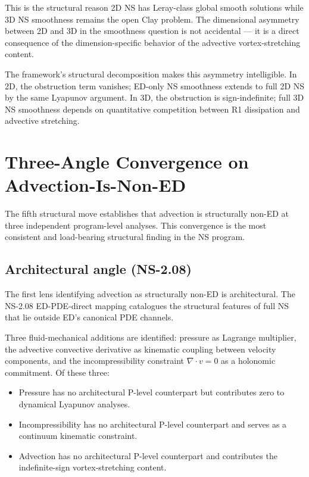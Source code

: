 \documentclass[11pt,a4paper]{article}
\begin{document}
This is the structural reason 2D NS has Leray-class global smooth solutions while 3D NS smoothness remains the open Clay problem. The dimensional asymmetry between 2D and 3D in the smoothness question is not accidental --- it is a direct consequence of the dimension-specific behavior of the advective vortex-stretching content.

The framework's structural decomposition makes this asymmetry intelligible. In 2D, the obstruction term vanishes; ED-only NS smoothness extends to full 2D NS by the same Lyapunov argument. In 3D, the obstruction is sign-indefinite; full 3D NS smoothness depends on quantitative competition between R1 dissipation and advective stretching.

\section{Three-Angle Convergence on Advection-Is-Non-ED}

The fifth structural move establishes that advection is structurally non-ED at three independent program-level analyses. This convergence is the most consistent and load-bearing structural finding in the NS program.

\subsection{Architectural angle (NS-2.08)}

The first lens identifying advection as structurally non-ED is architectural. The NS-2.08 ED-PDE-direct mapping catalogues the structural features of full NS that lie outside ED's canonical PDE channels.

Three fluid-mechanical additions are identified: pressure as Lagrange multiplier, the advective convective derivative as kinematic coupling between velocity components, and the incompressibility constraint $\nabla\cdot v = 0$ as a holonomic commitment. Of these three:

\begin{itemize}[noitemsep]
  \item Pressure has no architectural P-level counterpart but contributes zero to dynamical Lyapunov analyses.
  \item Incompressibility has no architectural P-level counterpart and serves as a continuum kinematic constraint.
  \item Advection has no architectural P-level counterpart and contributes the indefinite-sign vortex-stretching content.
\end{itemize}
\end{document}
